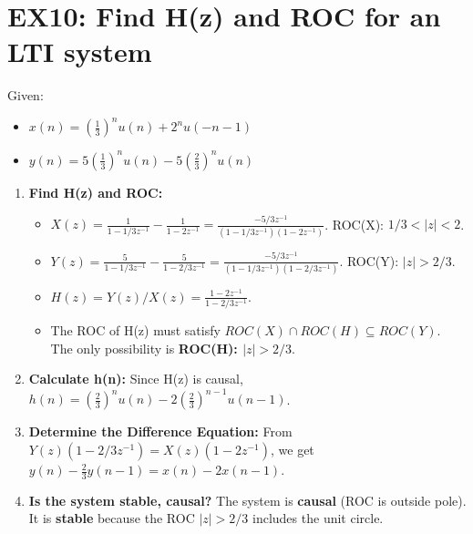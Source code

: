 \documentclass[a4paper,12pt]{article}
\begin{document}
\section*{EX10: Find H(z) and ROC for an LTI system}
Given:
\begin{itemize}
    \item $x(n) = (\frac{1}{3})^n u(n) + 2^n u(-n - 1)$
    \item $y(n) = 5(\frac{1}{3})^n u(n) - 5(\frac{2}{3})^n u(n)$
\end{itemize}
\begin{enumerate}
    \item \textbf{Find H(z) and ROC:}
        \begin{itemize}
            \item $X(z) = \frac{1}{1-1/3 z^{-1}} - \frac{1}{1-2z^{-1}} = \frac{-5/3 z^{-1}}{(1-1/3 z^{-1})(1-2z^{-1})}$. ROC(X): $1/3 < |z| < 2$.
            \item $Y(z) = \frac{5}{1-1/3 z^{-1}} - \frac{5}{1-2/3 z^{-1}} = \frac{-5/3 z^{-1}}{(1-1/3 z^{-1})(1-2/3 z^{-1})}$. ROC(Y): $|z|>2/3$.
            \item $H(z) = Y(z)/X(z) = \frac{1-2z^{-1}}{1-2/3 z^{-1}}$.
            \item The ROC of H(z) must satisfy $ROC(X) \cap ROC(H) \subseteq ROC(Y)$. The only possibility is \textbf{ROC(H): $|z|>2/3$}.
        \end{itemize}
    \item \textbf{Calculate h(n):} Since H(z) is causal, $h(n) = (\frac{2}{3})^n u(n) - 2(\frac{2}{3})^{n-1} u(n-1)$.
    \item \textbf{Determine the Difference Equation:} From $Y(z)(1-2/3 z^{-1}) = X(z)(1-2z^{-1})$, we get
        $y(n) - \frac{2}{3}y(n-1) = x(n) - 2x(n-1)$.
    \item \textbf{Is the system stable, causal?} The system is \textbf{causal} (ROC is outside pole). It is \textbf{stable} because the ROC $|z|>2/3$ includes the unit circle.
\end{enumerate}
\end{document}
